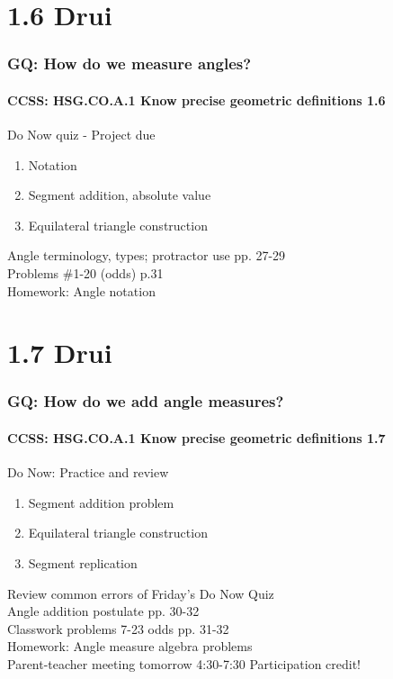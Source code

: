 \documentclass{beamer}
\begin{document}
\section{1.6 Drui}
  \frame
  {
    \frametitle{GQ: How do we measure angles?}
    \framesubtitle{CCSS: HSG.CO.A.1 Know precise geometric definitions  \alert{1.6}}

    \begin{block}{Do Now quiz - \alert{Project due}}
    \begin{enumerate}
        \item Notation
        \item Segment addition, absolute value
        \item Equilateral triangle construction
    \end{enumerate}
    \end{block}
    Angle terminology, types; protractor use pp. 27-29\\
    Problems \#1-20 (odds) p.31\\
    \vspace{1cm}
    Homework: Angle notation
  }

\section{1.7 Drui}
  \frame
  {
    \frametitle{GQ: How do we add angle measures?}
    \framesubtitle{CCSS: HSG.CO.A.1 Know precise geometric definitions  \alert{1.7}}

    \begin{block}{Do Now: Practice and review}
    \begin{enumerate}
        \item Segment addition problem
        \item Equilateral triangle construction
        \item Segment replication
    \end{enumerate}
    \end{block}
    Review common errors of Friday's Do Now Quiz\\
    Angle addition postulate pp. 30-32\\
    Classwork problems 7-23 odds pp. 31-32\\
    \vspace{1cm}
    Homework: Angle measure algebra problems\\
    Parent-teacher meeting tomorrow 4:30-7:30 \alert{Participation credit!}
  }
\end{document}

